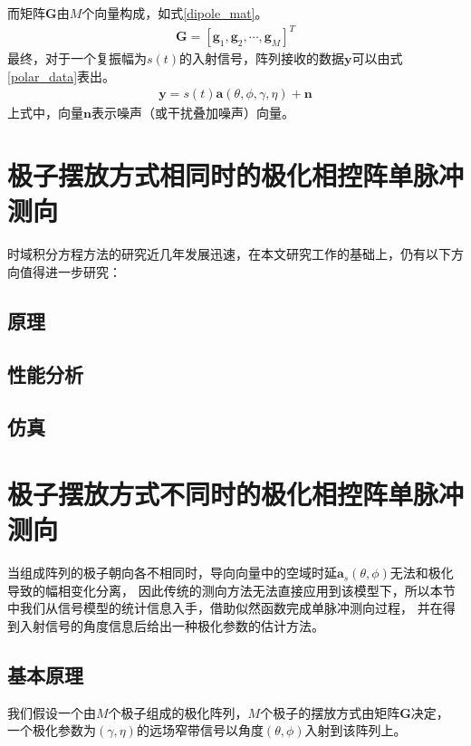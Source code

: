 \documentclass[master]{thesis-uestc}
\begin{document}
而矩阵$\bm{G}$由$M$个向量构成，如式\eqref{dipole_mat}。
\begin{equation}\label{dipole_mat}
    \begin{aligned}
        \bm{G}=\left[\bm{g}_{1}, \bm{g}_{2}, \cdots, \bm{g}_{M}\right]^{T}
    \end{aligned}
\end{equation}
最终，对于一个复振幅为$s(t)$的入射信号，阵列接收的数据$\bm{y}$可以由式\eqref{polar_data}表出。
\begin{equation}\label{polar_data}
    \begin{aligned}
        \bm{y}=s(t) \bm{a}(\theta, \phi, \gamma, \eta)+\bm{n}
    \end{aligned}
\end{equation}
上式中，向量$\bm{n}$表示噪声（或干扰叠加噪声）向量。

\section{极子摆放方式相同时的极化相控阵单脉冲测向}
时域积分方程方法的研究近几年发展迅速，在本文研究工作的基础上，仍有以下方向值得进一步研究：

\subsection{原理}

\subsection{性能分析}

\subsection{仿真}

\section{极子摆放方式不同时的极化相控阵单脉冲测向}
当组成阵列的极子朝向各不相同时，导向向量中的空域时延$\bm{a}_s(\theta,\phi)$无法和极化导致的幅相变化分离，
因此传统的测向方法无法直接应用到该模型下，所以本节中我们从信号模型的统计信息入手，借助似然函数完成单脉冲测向过程，
并在得到入射信号的角度信息后给出一种极化参数的估计方法。

\subsection{基本原理}
我们假设一个由$M$个极子组成的极化阵列，$M$个极子的摆放方式由矩阵$\bm{G}$决定，
一个极化参数为$(\gamma,\eta)$的远场窄带信号以角度$(\theta,\phi)$入射到该阵列上。
\end{document}
